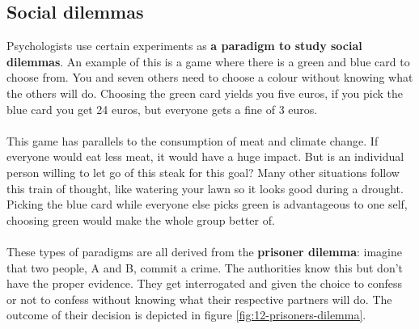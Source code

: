 \documentclass[../summary.tex]{subfiles}
\begin{document}
		\subsection{Social dilemmas}
		\label{sec:social-dilemmas}
			Psychologists use certain experiments as \textbf{a paradigm to study social dilemmas}. An example of this is a game where there is a green and blue card to choose from. You and seven others need to choose a colour without knowing what the others will do. Choosing the green card yields you five euros, if you pick the blue card you get 24 euros, but everyone gets a fine of 3 euros.
			\\\\
			This game has parallels to the consumption of meat and climate change. If everyone would eat less meat, it would have a huge impact. But is an individual person willing to let go of this steak for this goal? Many other situations follow this train of thought, like watering your lawn so it looks good during a drought. Picking the blue card while everyone else picks green is advantageous to one self, choosing green would make the whole group better of.
			\\\\
			These types of paradigms are all derived from the \textbf{prisoner dilemma}: imagine that two people, A and B, commit a crime. The authorities know this but don't have the proper evidence. They get interrogated and given the choice to confess or not to confess without knowing what their respective partners will do. The outcome of their decision is depicted in figure \ref{fig:12-prisoners-dilemma}. \\
			
\end{document}
